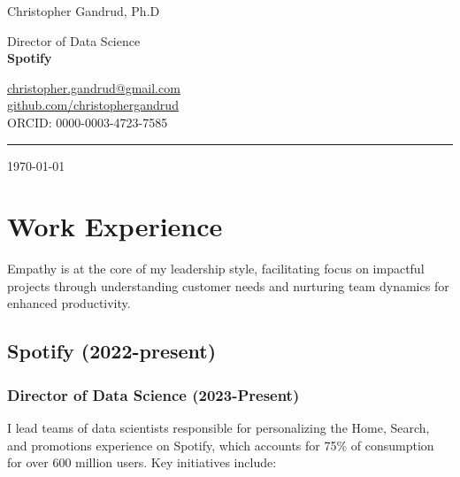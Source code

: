 \documentclass[a4paper]{article}
\begin{document}
\begin{flushright}
    {\huge Christopher Gandrud, Ph.D} \\
    \vspace{0.251cm}

    Director of Data Science \\
    {\bf{\large Spotify}} \\
    \vspace{0.25cm}

    \href{mailto:christopher.gandrud@gmail.com}{christopher.gandrud@gmail.com} \\
    \href{https://github.com/christophergandrud}{github.com/christophergandrud} \\
    ORCID: 0000-0003-4723-7585 \\
    \medskip\hrule height 1pt

    \vspace{0.5cm}
    \today
\end{flushright}

\vspace{0.5cm}

\section*{Work Experience}

\noindent Empathy is at the core of my leadership style, facilitating focus on impactful projects through understanding customer needs and nurturing team dynamics for enhanced productivity.

\subsection*{Spotify (2022-present)}

\subsubsection*{Director of Data Science (2023-Present)}

I lead teams of data scientists responsible for personalizing the Home, Search, and promotions experience on Spotify, which accounts for 75\% of consumption for over 600 million users. Key initiatives include: \\
\end{document}

